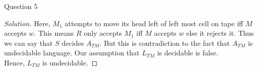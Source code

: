 \begin{solution}{Question 5}
\begin{proof}[Solution]
        Here, $M_1$ attempts to move its head left of left most cell on tape iff $M$ accepts $w$. This means $R$ only accepts $M_1$ iff $M$ accepts $w$ else it rejects it. Thus we can say that $S$ decides $A_{TM}$. But this is contradiction to the fact that $A_{TM}$ is undecidable language. Our assumption that $L_{TM}$ is decidable is false. \\
        
        Hence, $L_{TM}$ is undecidable.
        
    \end{proof}
\end{solution}
